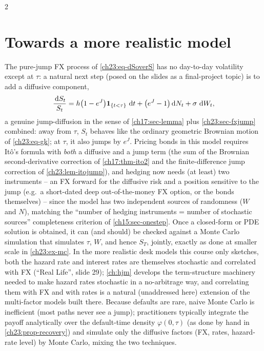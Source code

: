 \begin{paracol}{2}
\section{Towards a more realistic model}\label{ch23:sec-jumpdiffusion}
The pure-jump FX process of \cref{ch23:eq-dSoverS} has no day-to-day volatility except at $\tau$: a natural next
step (posed on the slides as a final-project topic) is to add a diffusive component,
\begin{equation}\label{ch23:eq-jumpdiffusion}
  \frac{\,\mathrm{d} S_t}{S_t}=h\bigl(1-e^J\bigr)\mathbf{1}_{\{t<\tau\}}\,\,\mathrm{d} t+\bigl(e^J-1\bigr)\,\mathrm{d} N_t+\sigma\,\,\mathrm{d} W_t,
\end{equation}
a genuine jump-diffusion in the sense of \cref{ch17:sec-lemma} plus \cref{ch23:sec-fxjump} combined: away from
$\tau$, $S_t$ behaves like the ordinary geometric Brownian motion of \cref{ch23:eq-gk}; at $\tau$, it also jumps by
$e^J$. Pricing bonds in this model requires It\^o's formula with \emph{both} a diffusive and a jump term (the
sum of the Brownian second-derivative correction of \cref{ch17:thm-ito2} and the finite-difference jump correction
of \cref{ch23:lem-itojump}), and hedging now needs (at least) two instruments -- an FX forward for the diffusive
risk and a position sensitive to the jump (e.g.\ a short-dated deep out-of-the-money FX option, or the bonds
themselves) -- since the model has two independent sources of randomness ($W$ and $N$), matching the ``number of
hedging instruments = number of stochastic sources'' completeness criterion of \cref{ch15:sec-onestep}. Once a
closed-form or PDE solution is obtained, it can (and should) be checked against a Monte Carlo simulation that
simulates $\tau$, $W$, and hence $S_T$, jointly, exactly as done at smaller scale in \cref{ch23:ex-mc}. In the more
realistic desk models this course only sketches, both the hazard rate and interest rates are themselves stochastic
and correlated with FX (``Real Life'', slide 29); \cref{ch:hjm} develops the term-structure machinery needed to
make hazard rates stochastic in a no-arbitrage way, and correlating them with FX and with rates is a natural
(unaddressed here) extension of the multi-factor models built there. Because defaults are rare, naive Monte Carlo
is inefficient (most paths never see a jump); practitioners typically integrate the payoff analytically over the
default-time density $\varphi(0,\tau)$ (as done by hand in \cref{ch23:prop-recovery}) and simulate only the
diffusive factors (FX, rates, hazard-rate level) by Monte Carlo, mixing the two techniques.


\end{paracol}
